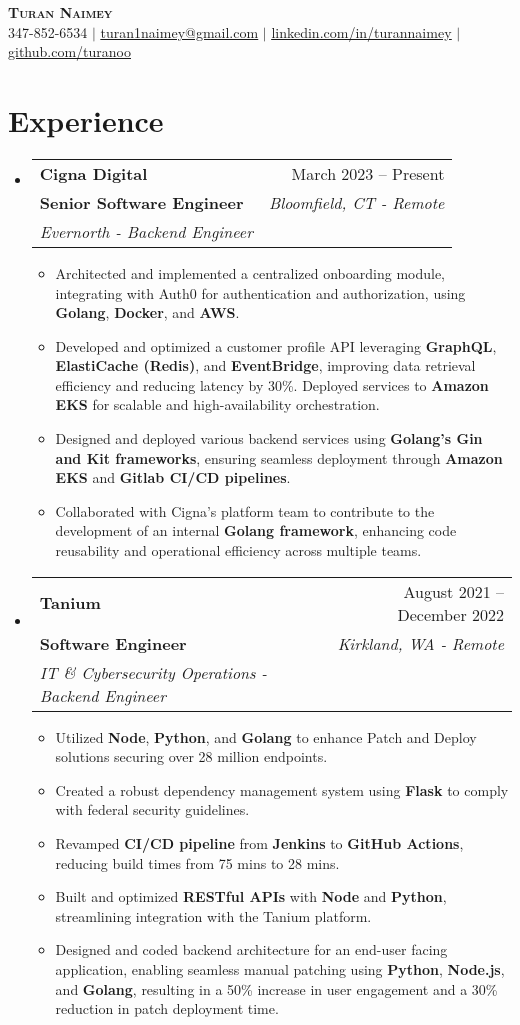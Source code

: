 \documentclass[letterpaper,11pt]{article}
\makeatletter
\newcommand{\resumeItem}[1]{
  \item\small{
    {#1 \vspace{-2pt}}
  }
}
\newcommand{\resumeSubheading}[5]{
  \vspace{-2pt}\item
    \begin{tabular*}{0.97\textwidth}[t]{l@{\extracolsep{\fill}}r}
      \textbf{#1} & #2 \\
      \textbf{\small#3} & \textit{\small #4} \\
      \textit{\small#5} \\
    \end{tabular*}\vspace{-7pt}
}
\newcommand{\resumeSubHeadingListStart}{\begin{itemize}[leftmargin=0.15in, label={}]}
\newcommand{\resumeSubHeadingListEnd}{\end{itemize}}
\newcommand{\resumeItemListStart}{\begin{itemize}}
\newcommand{\resumeItemListEnd}{\end{itemize}\vspace{-5pt}}
\makeatother
\begin{document}
\begin{center}
 \textbf{\Huge \scshape Turan Naimey} \\ \vspace{1pt}
 \small 347-852-6534 $|$ \href{mailto:turan1naimey@gmail.com}{\underline{turan1naimey@gmail.com}} $|$
 \href{https://linkedin.com/in/turannaimey}{\underline{linkedin.com/in/turannaimey}} $|$
 \href{https://github.com/turanoo}{\underline{github.com/turanoo}}
\end{center}

\section{Experience}

\resumeSubHeadingListStart
\resumeSubheading
{Cigna Digital}{March 2023 -- Present}
{Senior Software Engineer}{Bloomfield, CT - Remote}
{Evernorth - Backend Engineer}
\resumeItemListStart
\resumeItem{Architected and implemented a centralized onboarding module, integrating with Auth0 for authentication and authorization, using \textbf{Golang}, \textbf{Docker}, and \textbf{AWS}.}
\resumeItem{Developed and optimized a customer profile API leveraging \textbf{GraphQL}, \textbf{ElastiCache (Redis)}, and \textbf{EventBridge}, improving data retrieval efficiency and reducing latency by 30\%. Deployed services to \textbf{Amazon EKS} for scalable and high-availability orchestration.}
\resumeItem{Designed and deployed various backend services using \textbf{Golang’s Gin and Kit frameworks}, ensuring seamless deployment through \textbf{Amazon EKS} and \textbf{Gitlab CI/CD pipelines}.}
\resumeItem{Collaborated with Cigna’s platform team to contribute to the development of an internal \textbf{Golang framework}, enhancing code reusability and operational efficiency across multiple teams.}
\resumeItemListEnd
\resumeSubHeadingListEnd


\resumeSubHeadingListStart
\resumeSubheading
{Tanium}{August 2021 -- December 2022}
{Software Engineer}{Kirkland, WA - Remote}
{IT \& Cybersecurity Operations - Backend Engineer}
\resumeItemListStart
\resumeItem{Utilized \textbf{Node}, \textbf{Python}, and \textbf{Golang} to enhance Patch and Deploy solutions securing over 28 million endpoints.}
\resumeItem{Created a robust dependency management system using \textbf{Flask} to comply with federal security guidelines.}
\resumeItem{Revamped \textbf{CI/CD pipeline} from \textbf{Jenkins} to \textbf{GitHub Actions}, reducing build times from 75 mins to 28 mins.}
\resumeItem{Built and optimized \textbf{RESTful APIs} with \textbf{Node} and \textbf{Python}, streamlining integration with the Tanium platform.}
\resumeItem{Designed and coded backend architecture for an end-user facing application, enabling seamless manual patching using \textbf{Python}, \textbf{Node.js}, and \textbf{Golang}, resulting in a 50\% increase in user engagement and a 30\% reduction in patch deployment time.}
\resumeItemListEnd
\resumeSubHeadingListEnd
\end{document}
